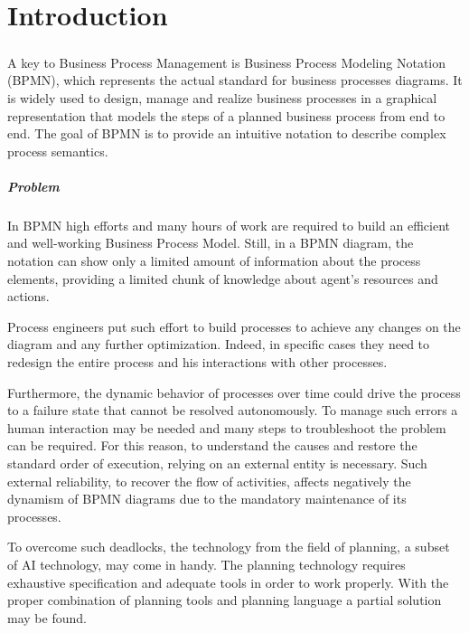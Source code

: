 \chapter*{Introduction} %
\label{Introduction}


\paragraph{}
A key to Business Process Management is Business Process Modeling Notation (BPMN), which represents the actual standard for business processes diagrams. It is widely used to design, manage and realize business processes in a graphical representation that models the steps of a planned business process from end to end. The goal of BPMN is to provide an intuitive notation to describe complex process semantics. 


\paragraph{Problem}
In BPMN high efforts and many hours of work are required to build an efficient and well-working Business Process Model. Still, in a BPMN diagram, the notation can show only a limited amount of information about the process elements, providing a limited chunk of knowledge about agent's resources and actions.

Process engineers put such effort to build processes to achieve any changes on the diagram and any further optimization. Indeed, in specific cases they need to redesign the entire process and his interactions with other processes.

Furthermore, the dynamic behavior of processes over time could drive the process to a failure state that cannot be resolved autonomously. To manage such errors a human interaction may be needed and many steps to troubleshoot the problem can be required. For this reason, to understand the causes and restore the standard order of execution, relying on an external entity is necessary. 
Such external reliability, to recover the flow of activities, affects negatively the dynamism of BPMN diagrams due to the mandatory maintenance of its processes. 

To overcome such deadlocks, the technology from the field of planning, a subset of AI technology, may come in handy. The planning technology requires exhaustive specification and adequate tools in order to work properly. With the proper combination of planning tools and planning language a partial solution may be found. 


